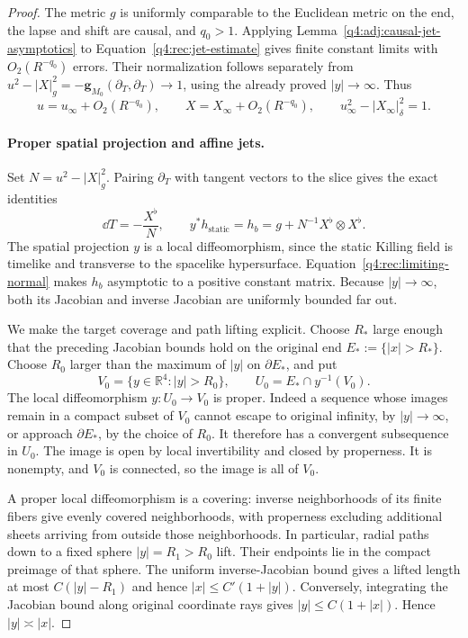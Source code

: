 \begin{proof}
The metric $g$ is uniformly comparable to the Euclidean metric on the end,
the lapse and shift are causal, and $q_0>1$.  Applying
Lemma~\ref{q4:adj:causal-jet-asymptotics} to
Equation~\eqref{q4:rec:jet-estimate} gives finite constant limits with
$O_2(R^{-q_0})$ errors.  Their normalization follows separately from
$u^2-|X|_g^2=-\mathbf g_{M_0}(\partial_T,\partial_T)\to1$,
using the already proved $|y|\to\infty$.  Thus
\begin{equation}
 u=u_\infty+O_2(R^{-q_0}),\qquad
 X=X_\infty+O_2(R^{-q_0}),\qquad
 u_\infty^2-|X_\infty|_\delta^2=1.
 \label{q4:rec:limiting-normal}
\end{equation}

\paragraph{Proper spatial projection and affine jets.}
Set $N=u^2-|X|_g^2$.  Pairing $\partial_T$ with tangent vectors to the slice
gives the exact identities
\begin{equation}
 \dd T=-\frac{X^\flat}{N},\qquad
 y^*h_{\mathrm{static}}
   =h_b=g+N^{-1}X^\flat\otimes X^\flat.
 \label{q4:rec:projection-identities}
\end{equation}
The spatial projection $y$ is a local diffeomorphism, since the static
Killing field is timelike and transverse to the spacelike hypersurface.
Equation~\eqref{q4:rec:limiting-normal} makes $h_b$ asymptotic to a positive
constant matrix.  Because $|y|\to\infty$, both its Jacobian and inverse
Jacobian are uniformly bounded far out.

We make the target coverage and path lifting explicit.  Choose $R_*$ large
enough that the preceding Jacobian bounds hold on the original end
$E_*:=\{|x|>R_*\}$.  Choose $R_0$ larger than the maximum of $|y|$ on
$\partial E_*$, and put
\[
 V_0=\{y\in\mathbb R^4:|y|>R_0\},\qquad
 U_0=E_*\cap y^{-1}(V_0).
\]
The local diffeomorphism $y:U_0\to V_0$ is proper.  Indeed a sequence whose
images remain in a compact subset of $V_0$ cannot escape to original
infinity, by $|y|\to\infty$, or approach $\partial E_*$, by the choice of
$R_0$.  It therefore has a convergent subsequence in $U_0$.  The image is
open by local invertibility and closed by properness.  It is nonempty, and
$V_0$ is connected, so the image is all of $V_0$.

A proper local diffeomorphism is a covering: inverse neighborhoods of its
finite fibers give evenly covered neighborhoods, with properness excluding
additional sheets arriving from outside those neighborhoods.  In particular,
radial paths down to a fixed sphere $|y|=R_1>R_0$ lift.  Their endpoints lie
in the compact preimage of that sphere.  The uniform inverse-Jacobian bound
gives a lifted length at most $C(|y|-R_1)$ and hence
$|x|\leq C'(1+|y|)$.  Conversely, integrating the Jacobian bound along
original coordinate rays gives
$|y|\leq C(1+|x|)$.  Hence $|y|\asymp|x|$.


\end{proof}
